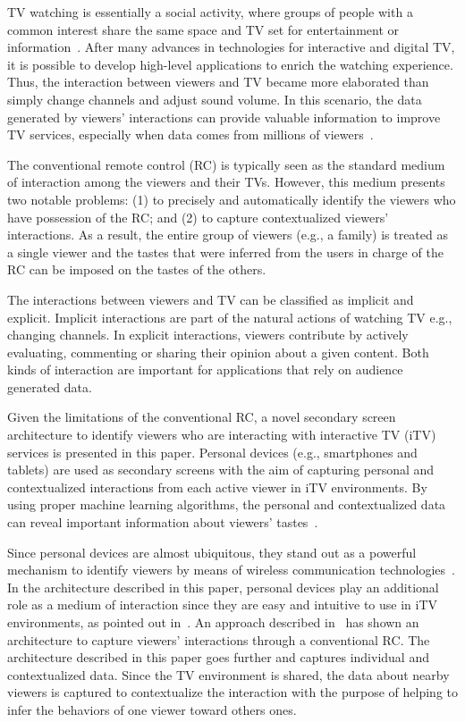 \documentclass[journal]{IEEEtran}
\begin{document}
TV watching is essentially a social activity, where groups of people with a common interest share the same space and TV set for entertainment or information~\cite{Masthoff2004}. After many advances in technologies for interactive and digital TV, it is possible to develop high-level applications to enrich the watching experience. Thus, the interaction between viewers and TV became more elaborated than simply change channels and adjust sound volume. In this scenario, the data generated by viewers' interactions can provide valuable information to improve TV services, especially when data comes from millions of viewers~\cite{Teixeira2010}.

The conventional remote control (RC) is typically seen as the standard medium of interaction among the viewers and their TVs. However, this medium presents two notable problems: (1) to precisely and automatically identify the viewers who have possession of the RC; and (2) to capture contextualized viewers' interactions. As a result, the entire group of viewers (e.g., a family) is treated as a single viewer and the tastes that were inferred from the users in charge of the RC can be imposed on the tastes of the others.

The interactions between viewers and TV can be classified as implicit and explicit. Implicit interactions are part of the natural actions of watching TV e.g., changing channels. In explicit interactions, viewers contribute by actively evaluating, commenting or sharing their opinion about a given content. Both kinds of interaction are important for applications that rely on audience generated data.

Given the limitations of the conventional RC, a novel secondary screen architecture to identify viewers who are interacting with interactive TV (iTV) services is presented in this paper. Personal devices (e.g., smartphones and tablets) are used as secondary screens with the aim of capturing personal and contextualized interactions from each active viewer in iTV environments. By using proper machine learning algorithms, the personal and contextualized data can reveal important information about viewers' tastes~\cite{Kim2012,Shin2009}. 

Since personal devices are almost ubiquitous, they stand out as a powerful mechanism to identify viewers by means of wireless communication technologies~\cite{Cabarcos2011}. In the architecture described in this paper, personal devices play an additional role as a medium of interaction since they are easy and intuitive to use in iTV environments, as pointed out in~\cite{Courtois2012}. An approach described in~\cite{Teixeira2010} has shown an architecture to capture viewers' interactions through a conventional RC. The architecture described in this paper goes further and captures individual and contextualized data. Since the TV environment is shared, the data about nearby viewers is captured to contextualize the interaction with the purpose of helping to infer the behaviors of one viewer toward others ones.
\end{document}
